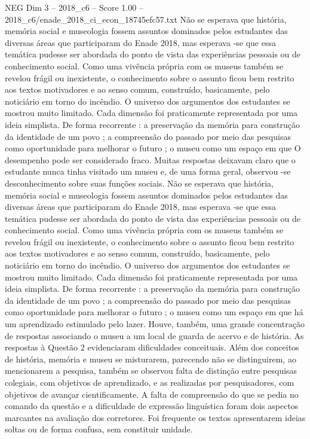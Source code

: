 \begin{textsample}{NEG Dim 3 – 2018\_c6 – Score 1.00 – 2018\_c6/enade\_2018\_ci\_econ\_18745efc57.txt}
Não se esperava que história, memória social e museologia fossem assuntos dominados pelos estudantes das diversas áreas que participaram do Enade 2018, mas esperava -se que essa temática pudesse ser abordada do ponto de vista das experiências pessoais ou de conhecimento social.
Como uma vivência própria com os museus também se revelou frágil ou inexistente, o conhecimento sobre o assunto ficou bem restrito aos textos motivadores e ao senso comum, construído, basicamente, pelo noticiário em torno do incêndio.
O universo dos argumentos dos estudantes se mostrou muito limitado.
Cada dimensão foi praticamente representada por uma ideia simplista.
De forma recorrente : a preservação da memória para construção da identidade de um povo ; a compreensão do passado por meio das pesquisas como oportunidade para melhorar o futuro ; o museu como um espaço em que O desempenho pode ser considerado fraco.
Muitas respostas deixavam claro que o estudante nunca tinha visitado um museu e, de uma forma geral, observou -se desconhecimento sobre suas funções sociais.
Não se esperava que história, memória social e museologia fossem assuntos dominados pelos estudantes das diversas áreas que participaram do Enade 2018, mas esperava -se que essa temática pudesse ser abordada do ponto de vista das experiências pessoais ou de conhecimento social.
Como uma vivência própria com os museus também se revelou frágil ou inexistente, o conhecimento sobre o assunto ficou bem restrito aos textos motivadores e ao senso comum, construído, basicamente, pelo noticiário em torno do incêndio.
O universo dos argumentos dos estudantes se mostrou muito limitado.
Cada dimensão foi praticamente representada por uma ideia simplista.
De forma recorrente : a preservação da memória para construção da identidade de um povo ; a compreensão do passado por meio das pesquisas como oportunidade para melhorar o futuro ; o museu como um espaço em que há um aprendizado estimulado pelo lazer.
Houve, também, uma grande concentração de respostas associando o museu a um local de guarda de acervo e de história.
As respostas à Questão 2 evidenciaram dificuldades conceituais.
Além dos conceitos de história, memória e museu se misturarem, parecendo não se distinguirem, ao mencionarem a pesquisa, também se observou falta de distinção entre pesquisas colegiais, com objetivos de aprendizado, e as realizadas por pesquisadores, com objetivos de avançar cientificamente.
A falta de compreensão do que se pedia no comando da questão e a dificuldade de expressão linguística foram dois aspectos marcantes na avaliação dos corretores.
Foi frequente os textos apresentarem ideias soltas ou de forma confusa, sem constituir unidade.

\end{textsample}
